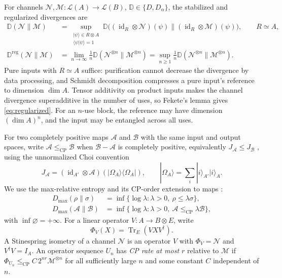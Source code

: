 \documentclass[11pt,letterpaper]{article}
\numberwithin{equation}{section}
\newcommand{\N}{\mathcal N}
\newcommand{\M}{\mathcal M}
\newcommand{\id}{\operatorname{id}}
\newcommand{\Tr}{\operatorname{Tr}}
\newcommand{\reg}{\mathrm{reg}}
\newcommand{\cp}{\mathrm{CP}}
\newcommand{\Dt}{D}
\newcommand{\cL}{\mathcal L}
\begin{document}
For channels $\N,\M:\cL(A)\to\cL(B)$, $\mathbb D\in\{D,\Dt_\alpha\}$, the stabilized and regularized divergences are
\begin{align}
 \mathbb D(\N\|\M)
 &=\sup_{\substack{|\psi\rangle\in R\otimes A\\\langle\psi|\psi\rangle=1}}
 \mathbb D\bigl((\id_R\otimes\N)(\psi)\|
                     (\id_R\otimes\M)(\psi)\bigr),
 \qquad R\simeq A,\label{eq:channel}\\
 \mathbb D^{\reg}(\N\|\M)
 &=\lim_{n\to\infty}\frac1n\mathbb D(\N^{\otimes n}\|\M^{\otimes n})
 =\sup_{n\ge1}\frac1n\mathbb D(\N^{\otimes n}\|\M^{\otimes n}).
 \label{eq:regularized}
\end{align}
Pure inputs with $R\simeq A$ suffice: purification cannot decrease the divergence by data processing, and Schmidt decomposition compresses a pure input's reference to dimension $\dim A$. Tensor additivity on product inputs makes the channel divergence superadditive in the number of uses, so Fekete's lemma gives \eqref{eq:regularized}. For an $n$-use block, the reference may have dimension $(\dim A)^n$, and the input may be entangled across all uses.

For two completely positive maps $\mathcal A$ and $\mathcal B$ with the same input and output spaces, write $\mathcal A\le_{\cp}\mathcal B$ when $\mathcal B-\mathcal A$ is completely positive, equivalently $J_{\mathcal A}\le J_{\mathcal B}$ \cite{Choi}, using the unnormalized Choi convention
\begin{equation}\label{eq:choi}
 J_{\mathcal A}=(\id_{A'}\otimes\mathcal A)
                  (|\Omega_A\rangle\!\langle\Omega_A|),
 \qquad |\Omega_A\rangle=\sum_i|i\rangle_{A'}|i\rangle_A.
\end{equation}
We use the max-relative entropy \cite{Datta} and its CP-order extension to maps \cite[Eq.~(13)]{Gour}:
\begin{equation}\label{eq:Dmax}
 \begin{split}
 D_{\max}(\rho\|\sigma)&=\inf\{\log\lambda:\lambda>0,\ \rho\le\lambda\sigma\},\\
 D_{\max}(\mathcal A\|\mathcal B)&=\inf\{\log\lambda:\lambda>0,\ \mathcal A\le_{\cp}\lambda\mathcal B\},
 \end{split}
\end{equation}
with $\inf\varnothing=+\infty$.
For a linear operator $V:A\to B\otimes E$, write
\begin{equation}\label{eq:Phi}
 \Phi_V(X)=\Tr_E(VXV^\dagger).
\end{equation}
A Stinespring isometry of a channel $\N$ is an operator $V$ with $\Phi_V=\N$ and $V^\dagger V=I_A$.
An operator sequence $U_n$ has \emph{CP rate at most $r$} relative to $\M$ if
$\Phi_{U_n}\le_{\cp}C\,2^{nr}\M^{\otimes n}$ for all sufficiently large $n$ and some constant $C$ independent of $n$.
\end{document}
